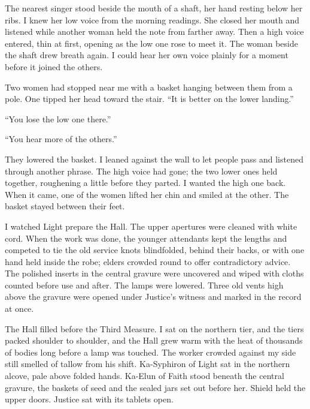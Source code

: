The nearest singer stood beside the mouth of a shaft, her hand resting below her ribs. I knew her low voice from the morning readings. She closed her mouth and listened while another woman held the note from farther away. Then a high voice entered, thin at first, opening as the low one rose to meet it. The woman beside the shaft drew breath again. I could hear her own voice plainly for a moment before it joined the others.\par

Two women had stopped near me with a basket hanging between them from a pole. One tipped her head toward the stair. ``It is better on the lower landing.''\par
``You lose the low one there.''\par
``You hear more of the others.''\par
They lowered the basket. I leaned against the wall to let people pass and listened through another phrase. The high voice had gone; the two lower ones held together, roughening a little before they parted. I wanted the high one back. When it came, one of the women lifted her chin and smiled at the other. The basket stayed between their feet.\par

I watched Light prepare the Hall. The upper apertures were cleaned with white cord. When the work was done, the younger attendants kept the lengths and competed to tie the old service knots blindfolded, behind their backs, or with one hand held inside the robe; elders crowded round to offer contradictory advice. The polished inserts in the central gravure were uncovered and wiped with cloths counted before use and after. The lamps were lowered. Three old vents high above the gravure were opened under Justice's witness and marked in the record at once.\par

\ornament

The Hall filled before the Third Measure. I sat on the northern tier, and the tiers packed shoulder to shoulder, and the Hall grew warm with the heat of thousands of bodies long before a lamp was touched. The worker crowded against my side still smelled of tallow from his shift. Ka-Syphiron of Light sat in the northern alcove, pale above folded hands. Ka-Elun of Faith stood beneath the central gravure, the baskets of seed and the sealed jars set out before her. Shield held the upper doors. Justice sat with its tablets open.\par

